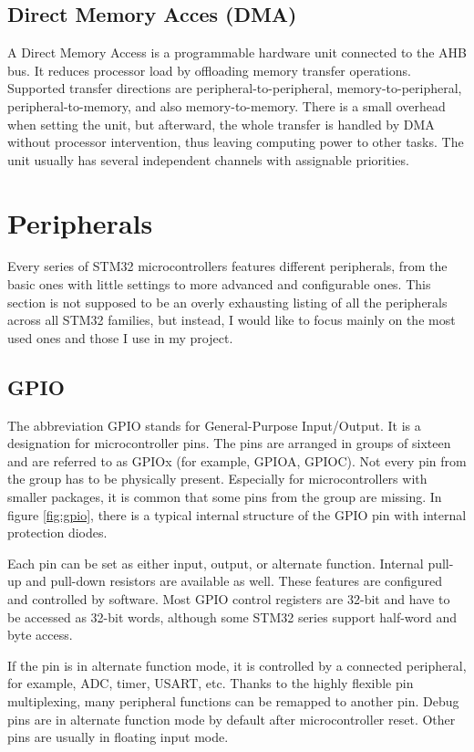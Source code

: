 	\subsection{Direct Memory Acces (DMA)}
	\label{sub:dma}
A Direct Memory Access is a programmable hardware unit connected to the AHB bus. It reduces processor load by offloading memory transfer operations. Supported transfer directions are peripheral-to-peripheral, memory-to-peripheral, peripheral-to-memory, and also memory-to-memory. There is a small overhead when setting the unit, but afterward, the whole transfer is handled by DMA without processor intervention, thus leaving computing power to other tasks. The unit usually has several independent channels with assignable priorities.


\section{Peripherals}
\label{sec:stm_periph}
Every series of STM32 microcontrollers features different peripherals, from the basic ones with little settings to more advanced and configurable ones. This section is not supposed to be an overly exhausting listing of all the peripherals across all STM32 families, but instead, I would like to focus mainly on the most used ones and those I use in my project.

	\subsection{GPIO}
	\label{sub:gpio}
The abbreviation GPIO stands for General-Purpose Input/Output. It is a designation for microcontroller pins. The pins are arranged in groups of sixteen and are referred to as GPIOx (for example, GPIOA, GPIOC). Not every pin from the group has to be physically present. Especially for microcontrollers with smaller packages, it is common that some pins from the group are missing. In figure \ref{fig:gpio}, there is a typical internal structure of the GPIO pin with internal protection diodes.

Each pin can be set as either input, output, or alternate function. Internal pull-up and pull-down resistors are available as well. These features are configured and controlled by software. Most GPIO control registers are 32-bit and have to be accessed as 32-bit words, although some STM32 series support half-word and byte access.

If the pin is in alternate function mode, it is controlled by a connected peripheral, for example, ADC, timer, USART, etc. Thanks to the highly flexible pin multiplexing, many peripheral functions can be remapped to another pin. Debug pins are in alternate function mode by default after microcontroller reset. Other pins are usually in floating input mode.

